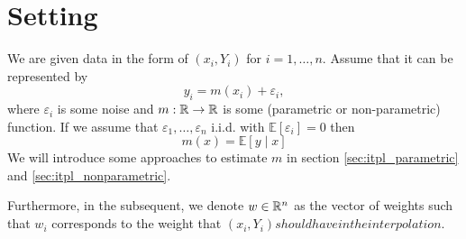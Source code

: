 \section{Setting}{
	We are given data in the form of $\left(x_{i}, Y_{i}\right)$ for $i=1, \ldots, n$. Assume that it can be represented by
	$$
		y_{i}=m\left(x_{i}\right)+\varepsilon_{i},
	$$
	where $\varepsilon_i$ is some noise and $m: \mathbb{R} \rightarrow \mathbb{R}$ is some (parametric or non-parametric) function. If we assume that $\varepsilon_{1}, \ldots, \varepsilon_{n}$ i.i.d. with $\mathbb{E}\left[\varepsilon_{i}\right]=0$ then $$m(x)=\mathbb{E}[y \mid x]$$
	We will introduce some approaches to estimate $m$ in section \ref{sec:itpl_parametric} and \ref{sec:itpl_nonparametric}.

	Furthermore, in the subsequent, we denote $w\in \mathbb{R}^n$ as the vector of weights such that $w_i$ corresponds to the weight that $(x_i, Y_i) should have in the interpolation$. 
}








